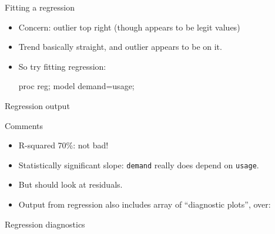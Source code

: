 \documentclass[unknownkeysallowed]{beamer}\usepackage[]{graphicx}\usepackage[]{color}
\begin{document}
\begin{frame}[fragile]{Fitting a regression}

  \begin{itemize}
  \item Concern: outlier top right (though appears to be legit values)
  \item Trend basically straight, and outlier appears to be on it.
  \item So try fitting regression:

    \begin{Sascode}[store=ddb]
proc reg;
  model demand=usage;      
    \end{Sascode}
    

  \end{itemize}
  
\end{frame}


\begin{frame}[fragile]{Regression output}



\end{frame}

\begin{frame}[fragile]{Comments}

  \begin{itemize}
  \item R-squared 70\%: not bad!
  \item Statistically significant slope: \texttt{demand} really does
    depend on \texttt{usage}.
  \item But should look at residuals.
  \item Output from regression also includes array of ``diagnostic
    plots'', over:

  \end{itemize}

\end{frame}

\begin{frame}[fragile]{Regression diagnostics}
  
  
\end{frame}
\end{document}
